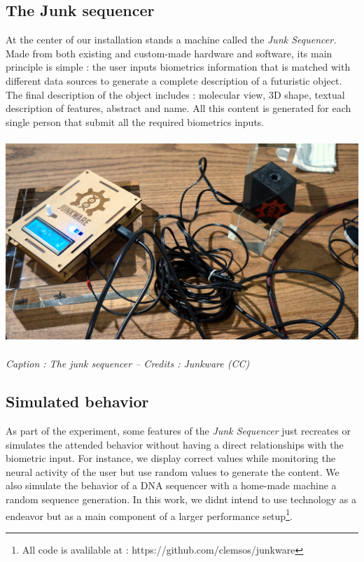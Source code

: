 \subsection{The Junk sequencer}
At the center of our installation stands a machine called the
\textit{Junk Sequencer. }Made from both existing and custom-made
hardware and software, its main principle is simple : the user inputs
biometrics information that is matched with different data sources to
generate a complete description of a futuristic object. The final
description of the object includes : molecular view, 3D shape, textual
description of features, abstract and name. All this content is
generated for each single person that submit all the required
biometrics inputs.


\bigskip



\begin{center}
\includegraphics[width=5.5in,height=3.0547in]{images/junkware-img2.jpg}
\end{center}
{\centering\itshape
Caption : The junk sequencer -- Credits : Junkware (CC)
\par}


\bigskip

\subsection{Simulated behavior}
As part of the experiment, some features of the \textit{Junk Sequencer
}just recreates or simulates the attended behavior without having a
direct relationships with the biometric input. For instance, we display
correct values while monitoring the neural activity of the user but use
random values to generate the content. We also simulate the behavior of
a DNA sequencer with a home-made machine a random sequence generation.
In this work, we didn{\textquotesingle}t intend to use technology as a
endeavor but as a main component of a larger performance
setup\footnote{All code is avalilable at :
https://github.com/clemsos/junkware}.

